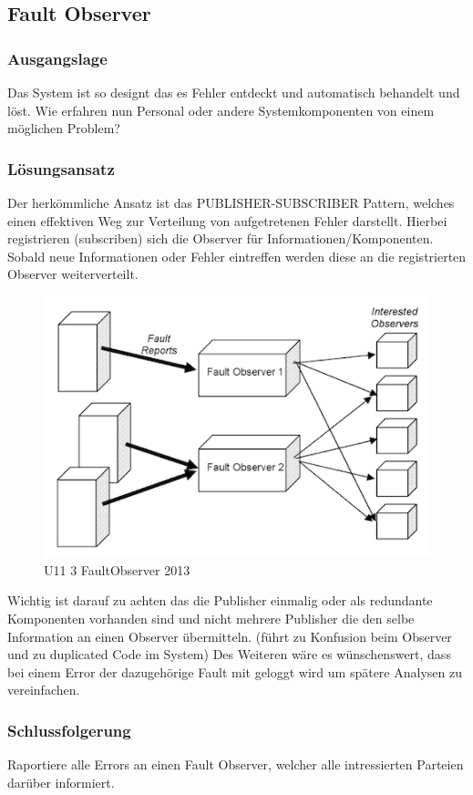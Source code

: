 
\subsection{Fault Observer}

\subsubsection*{Ausgangslage}

Das System ist so designt das es Fehler entdeckt und automatisch behandelt und löst. Wie erfahren nun Personal oder andere Systemkomponenten von einem möglichen Problem?

\subsubsection*{Lösungsansatz}

Der herkömmliche Ansatz ist das PUBLISHER-SUBSCRIBER Pattern, welches einen effektiven Weg zur Verteilung von aufgetretenen Fehler darstellt. Hierbei registrieren (subscriben) sich die Observer für Informationen/Komponenten. Sobald neue Informationen oder Fehler eintreffen werden diese an die registrierten Observer weiterverteilt.

\begin{figure}[H]
	\centering
	\includegraphics[width=\textwidth]{content/faulttolerance/images/U11_3_FaultObserver_2013.png}
	\caption{U11 3 FaultObserver 2013}
\end{figure}


Wichtig ist darauf zu achten das die Publisher einmalig oder als redundante Komponenten vorhanden sind und nicht mehrere Publisher die den selbe Information an einen Observer übermitteln. (führt zu Konfusion beim Observer und zu duplicated Code im System) Des Weiteren wäre es wünschenswert, dass bei einem Error der dazugehörige Fault mit geloggt wird um spätere Analysen zu vereinfachen.

\subsubsection*{Schlussfolgerung}

Raportiere alle Errors an einen Fault Observer, welcher alle intressierten Parteien darüber informiert.
